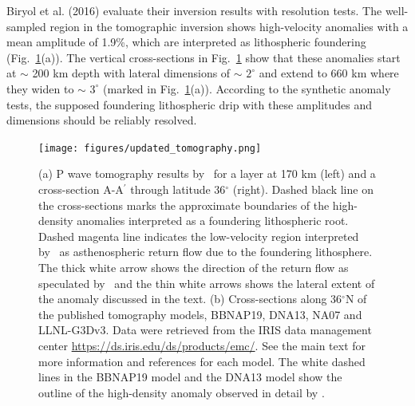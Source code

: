 \documentclass[draft,linenumbers]{agujournal2018}
\begin{document}
    Biryol et al. (2016) evaluate their inversion results with resolution tests. The well-sampled region in the tomographic inversion shows high-velocity anomalies with a mean amplitude of 1.9\%, which are interpreted as lithospheric foundering (Fig.~\ref{fig_tomo}(a)). The vertical cross-sections in Fig.~\ref{fig_tomo} show that these anomalies start at $\sim$ 200 km depth with lateral dimensions of  $\sim$ $2^\circ$ and extend to 660 km where they widen to $\sim$ $3^\circ$ (marked in Fig.~\ref{fig_tomo}(a)). According to the synthetic anomaly tests, the supposed foundering lithospheric drip with these amplitudes and dimensions should be reliably resolved.
%
\begin{figure}[h!]
    \centering
    \texttt{[image: figures/updated\_tomography.png]}
    \caption{(a) P wave tomography results by~\citet{Biryol_2016} for a layer at 170 km (left) and a cross-section A-A$^{\prime}$ through latitude 36$^\circ$ (right). Dashed black line on the cross-sections marks the approximate boundaries of the high-density anomalies interpreted as a foundering lithospheric root. Dashed magenta line indicates the low-velocity region interpreted by~\citet{Biryol_2016} as asthenospheric return flow due to the foundering lithosphere. The thick white arrow shows the direction of the return flow as speculated by~\citet{Biryol_2016} and the thin white arrows shows the lateral extent of the anomaly discussed in the text. (b) Cross-sections along 36$^\circ$N of the published tomography models, BBNAP19, DNA13, NA07 and LLNL-G3Dv3. Data were retrieved from the IRIS data management center \url{https://ds.iris.edu/ds/products/emc/}. See the main text for more information and references for each model. The white dashed lines in the BBNAP19 model and the DNA13 model show the outline of the high-density anomaly observed in detail by \citet{Biryol_2016}.}
    \label{fig_tomo}
 \end{figure}
 
\end{document}
